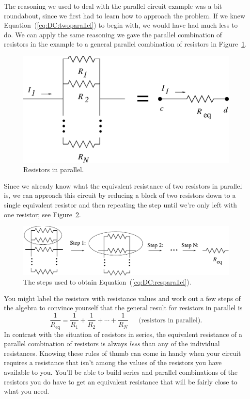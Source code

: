 The reasoning we used to deal with the parallel circuit example was a bit
roundabout, since we first had to learn how to approach the problem.  If we 
knew Equation~(\ref{eq:DC:twoparallel}) to begin with, we would have had much 
less to do. We can apply the same reasoning we gave the parallel combination 
of resistors in the example to a general parallel combination of resistors in
Figure~\ref{fig:DC:resistpar}.
\begin{figure}[htb]
\centering \epsfxsize=10cm \includegraphics[scale=0.6]{2_dc/resistpar.eps}
\caption{Resistors in parallel.}
\label{fig:DC:resistpar}
\end{figure}
Since we already know what the equivalent resistance of two resistors in 
parallel is, we can approach this circuit by reducing a block of two resistors
down to a single equivalent resistor and then repeating the step until we're 
only left with one resistor; see Figure~\ref{fig:DC:parallelred}.
\begin{figure}[htb]
\centering \epsfxsize=14cm \includegraphics[scale=0.5]{2_dc/parallelred.eps}
\caption{The steps used to obtain Equation~(\ref{eq:DC:resparallel}).}
\label{fig:DC:parallelred}
\end{figure}
You might label the resistors with resistance values and work out a few steps 
of the algebra to convince yourself that the general result for resistors in 
parallel is 
\begin{equation}
\frac{1}{R_{\mbox{eq}}} = \frac{1}{R_1} + \frac{1}{R_2}+\cdots +\frac{1}{R_N}
~~~~~~~\mbox{(resistors in parallel)}.  \label{eq:DC:resparallel}
\end{equation}
In contrast with the situation of resistors in series, the equivalent 
resistance of a parallel combination of resistors is always {\it less} than
any of the individual resistances.  Knowing these rules of thumb can come in 
handy when your circuit requires a resistance that isn't among the values
of the resistors you have available to you.  You'll be able to build series and
parallel combinations of the resistors you do have to get an equivalent 
resistance that will be fairly close to what you need.


